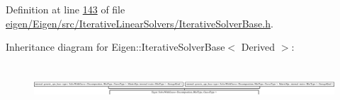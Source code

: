 Definition at line \hyperlink{eigen_2_eigen_2src_2_iterative_linear_solvers_2_iterative_solver_base_8h_source_l00143}{143} of file \hyperlink{eigen_2_eigen_2src_2_iterative_linear_solvers_2_iterative_solver_base_8h_source}{eigen/\+Eigen/src/\+Iterative\+Linear\+Solvers/\+Iterative\+Solver\+Base.\+h}.

Inheritance diagram for Eigen\+:\+:Iterative\+Solver\+Base$<$ Derived $>$\+:\begin{figure}[H]
\begin{center}
\leavevmode
\includegraphics[height=1.772152cm]{group___iterative_linear_solvers___module}
\end{center}
\end{figure}
